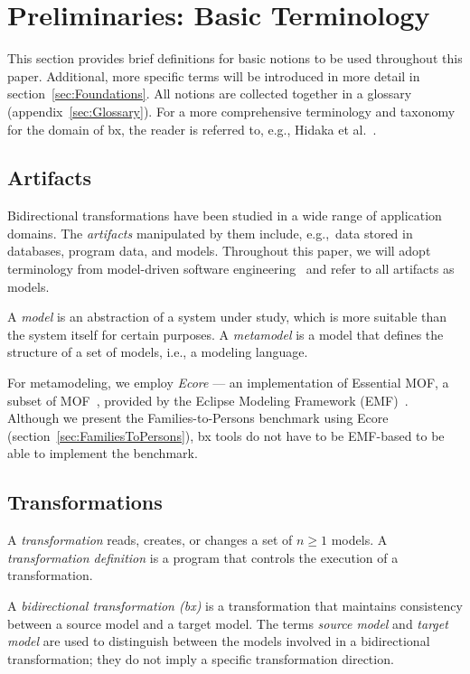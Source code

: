 \section{Preliminaries:  Basic Terminology}
\label{sec:Terminology}

This section provides brief definitions for basic notions to be used throughout this paper. 
Additional, more specific terms will be introduced in more detail in section~\ref{sec:Foundations}. 
All notions are collected together in a glossary (appendix~\ref{sec:Glossary}). 
For a more comprehensive terminology and taxonomy for the domain of bx, the reader is referred to, e.g., Hidaka et al.~\cite{SOSYM-Hidaka2016}.

\subsection{Artifacts}
\label{sec:Artifacts}

Bidirectional transformations have been studied in a wide range of application domains. 
The \emph{artifacts} manipulated by them include, e.g.,\ data stored in databases, program data, and models. Throughout this paper, we will adopt terminology from model-driven software engineering~\cite{RodriguesdaSilva2015139} and refer to all artifacts as models. 

A \emph{model} is an abstraction of a system under study, which is more suitable than the system itself for certain purposes. 
A \emph{metamodel} is a model that defines the structure of a set of models, i.e., a modeling language.

For metamodeling, we employ \emph{Ecore} --- an implementation of Essential MOF, a subset of MOF~\cite{MOF-2.5.1}, provided by the Eclipse Modeling Framework (EMF)~\cite{steinberg09}. 
Although we present the Families-to-Persons benchmark using Ecore (section~\ref{sec:FamiliesToPersons}), bx tools do not have to be EMF-based to be able to implement the benchmark.

\subsection{Transformations} 
\label{sec:Transformations}

A \emph{transformation} reads, creates, or changes a set of $n \geq 1$ models.
A \emph{transformation definition} is a program that controls the execution of a transformation.

A \emph{bidirectional transformation (bx)} is a transformation that maintains consistency between a source model and a target model. 
The terms \emph{source model} and \emph{target model} are used to distinguish between the models involved in a bidirectional transformation; they do not imply a specific transformation direction.

